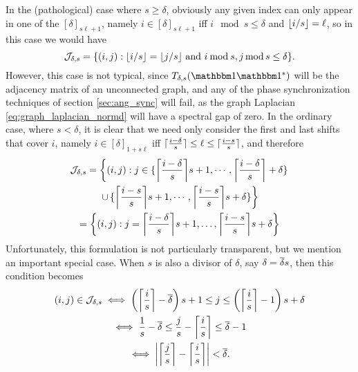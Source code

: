 In the (pathological) case where $s \ge \delta$, obviously any given index can only appear in one of the $[\delta]_{s \ell + 1}$, namely $i \in [\delta]_{s \ell + 1}$ iff $i \mod s \le \delta$ and $\floor{i / s} = \ell$, so in this case we would have \[\mathcal{J}_{\delta, s} = \{(i, j) : \floor{i / s} = \floor{j / s} \ \text{and} \ i \mathbin{\mathrm{mod}} s, j \mod s \le \delta\}.\]  However, this case is not typical, since $T_{\delta, s}(\one \one^*)$ will be the adjacency matrix of an unconnected graph, and any of the phase synchronization techniques of section \ref{sec:ang_sync} will fail, as the graph Laplacian \eqref{eq:graph_laplacian_normd} will have a spectral gap of zero.  In the ordinary case, where $s < \delta$, it is clear that we need only consider the first and last shifts that cover $i$, namely $i \in [\delta]_{1 + s \ell}$ iff $\ceil{\frac{i - \delta}{s}} \le \ell \le \ceil{\frac{i - s}{s}}$, and therefore
\begin{gather*}
  \mathcal{J}_{\delta, s} = \left\{(i, j) : j \in \{\ceil*{\frac{i - \delta}{s}}s + 1, \cdots, \ceil*{\frac{i - \delta}{s}} + \delta\}\right. \\
  \left. \cup\, \{\ceil*{\frac{i - s}{s}}s + 1, \cdots, \ceil*{\frac{i - s}{s}}s + \delta\} \right\} \\
  = \left\{(i, j) : j = \ceil*{\frac{i - \delta}{s}}s + 1, \ldots, \ceil*{\frac{i - s}{s}}s + \delta \right\}
\end{gather*}
Unfortunately, this formulation is not particularly transparent, but we mention an important special case.  When $s$ is also a divisor of $\delta$, say $\delta = \deltabar s$, then this condition becomes
\begin{gather*}
  (i, j) \in \mathcal{J}_{\delta, s} \iff \left(\ceil*{\frac{i}{s}} - \deltabar\right) s + 1 \le j \le \left(\ceil*{\frac{i}{s}} - 1\right) s + \delta \\
  \iff \frac{1}{s} - \deltabar \le  \frac{j}{s} - \ceil*{\frac{i}{s}} \le \deltabar - 1 \\
  \iff \left| \ceil*{\frac{j}{s}} - \ceil*{\frac{i}{s}} \right| < \deltabar.
\end{gather*}

